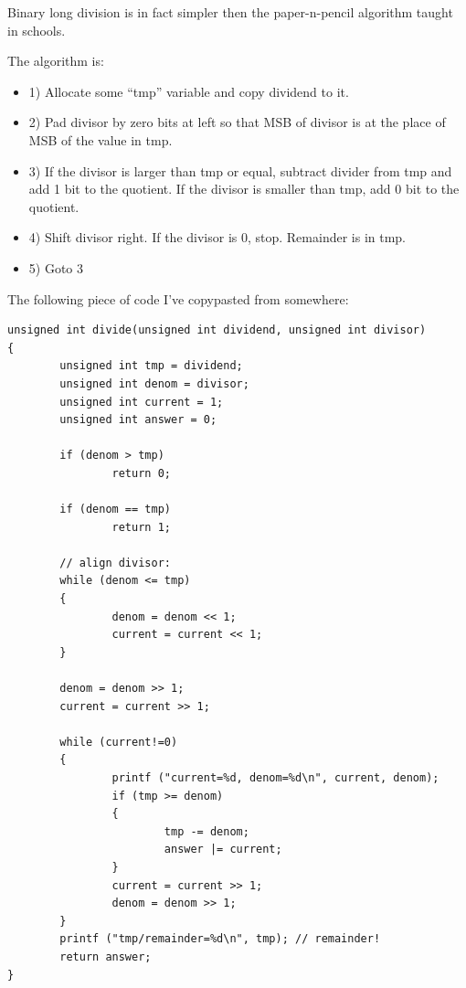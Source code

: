 Binary long division is in fact simpler then the paper-n-pencil algorithm taught in schools.

The algorithm is:

\begin{itemize}

\item 1) Allocate some ``tmp'' variable and copy dividend to it.

\item 2) Pad divisor by zero bits at left so that MSB of divisor is at the place of MSB of the value in tmp.

\item 3) If the divisor is larger than tmp or equal, subtract divider from tmp and add 1 bit to the quotient.
If the divisor is smaller than tmp, add 0 bit to the quotient.

\item 4) Shift divisor right.
If the divisor is 0, stop. Remainder is in tmp.

\item 5) Goto 3

\end{itemize}

The following piece of code I've copypasted from somewhere:

\begin{lstlisting}[style=customc]
unsigned int divide(unsigned int dividend, unsigned int divisor)
{
        unsigned int tmp = dividend;
        unsigned int denom = divisor;
        unsigned int current = 1;
        unsigned int answer = 0;

        if (denom > tmp)
                return 0;

        if (denom == tmp)
                return 1;

        // align divisor:
        while (denom <= tmp)
        {
                denom = denom << 1;
                current = current << 1;
        }

        denom = denom >> 1;
        current = current >> 1;

        while (current!=0)
        {
                printf ("current=%d, denom=%d\n", current, denom);
                if (tmp >= denom)
                {
                        tmp -= denom;
                        answer |= current;
                }
                current = current >> 1;
                denom = denom >> 1;
        }
        printf ("tmp/remainder=%d\n", tmp); // remainder!
        return answer;
}
\end{lstlisting}

